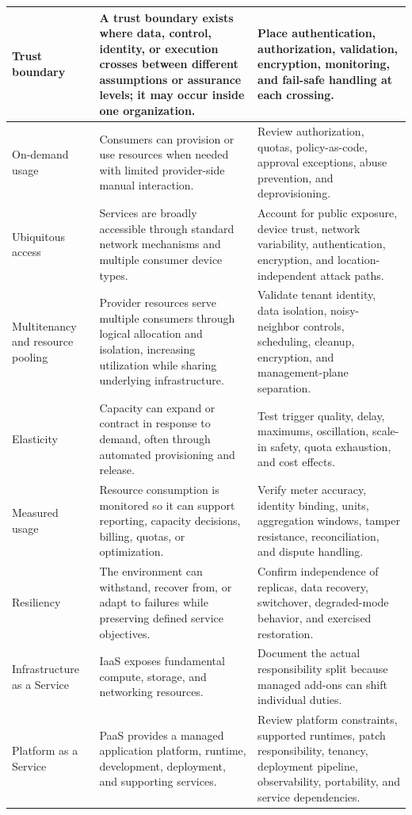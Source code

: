 \documentclass[11pt]{article}
\begin{document}
\begin{longtable}{@{}>{\RaggedRight\arraybackslash}p{}>{\RaggedRight\arraybackslash}p{}>{\RaggedRight\arraybackslash}p{}@{}}
Trust boundary & A trust boundary exists where data, control, identity, or execution crosses between different assumptions or assurance levels; it may occur inside one organization. & Place authentication, authorization, validation, encryption, monitoring, and fail-safe handling at each crossing. \\\midrule
On-demand usage & Consumers can provision or use resources when needed with limited provider-side manual interaction. & Review authorization, quotas, policy-as-code, approval exceptions, abuse prevention, and deprovisioning. \\\midrule
Ubiquitous access & Services are broadly accessible through standard network mechanisms and multiple consumer device types. & Account for public exposure, device trust, network variability, authentication, encryption, and location-independent attack paths. \\\midrule
Multitenancy and resource pooling & Provider resources serve multiple consumers through logical allocation and isolation, increasing utilization while sharing underlying infrastructure. & Validate tenant identity, data isolation, noisy-neighbor controls, scheduling, cleanup, encryption, and management-plane separation. \\\midrule
Elasticity & Capacity can expand or contract in response to demand, often through automated provisioning and release. & Test trigger quality, delay, maximums, oscillation, scale-in safety, quota exhaustion, and cost effects. \\\midrule
Measured usage & Resource consumption is monitored so it can support reporting, capacity decisions, billing, quotas, or optimization. & Verify meter accuracy, identity binding, units, aggregation windows, tamper resistance, reconciliation, and dispute handling. \\\midrule
Resiliency & The environment can withstand, recover from, or adapt to failures while preserving defined service objectives. & Confirm independence of replicas, data recovery, switchover, degraded-mode behavior, and exercised restoration. \\\midrule
Infrastructure as a Service & IaaS exposes fundamental compute, storage, and networking resources. & Document the actual responsibility split because managed add-ons can shift individual duties. \\\midrule
Platform as a Service & PaaS provides a managed application platform, runtime, development, deployment, and supporting services. & Review platform constraints, supported runtimes, patch responsibility, tenancy, deployment pipeline, observability, portability, and service dependencies. \\\midrule

\end{longtable}
\end{document}
